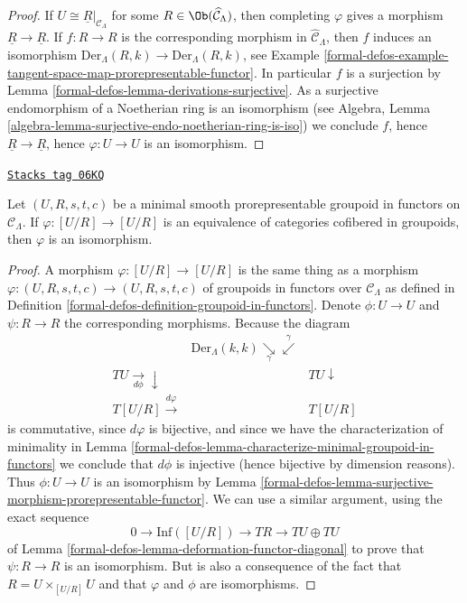 \begin{proof}
If $U \cong \underline{R}|_{\mathcal{C}_\Lambda}$ for some
$R \in \Ob(\widehat{\mathcal{C}}_\Lambda)$,
then completing $\varphi$ gives a morphism $\underline{R} \to \underline{R}$.
If $f: R \to R$ is the corresponding morphism in
$\widehat{\mathcal{C}}_\Lambda$, then $f$ induces an isomorphism
$\text{Der}_\Lambda(R, k) \to \text{Der}_\Lambda(R, k)$, see
Example \ref{formal-defos-example-tangent-space-map-prorepresentable-functor}.
In particular $f$ is a surjection by
Lemma \ref{formal-defos-lemma-derivations-surjective}.
As a surjective endomorphism of a Noetherian ring is an isomorphism (see
Algebra, Lemma \ref{algebra-lemma-surjective-endo-noetherian-ring-is-iso})
we conclude $f$, hence $\underline{R}
\to \underline{R}$, hence $\varphi : U \to U$
is an isomorphism.
\end{proof}

\begin{lemma}
\label{formal-defos-lemma-minimal-prorepresentable-groupoid-autoequivalence}
\href{https://stacks.math.columbia.edu/tag/06KQ}{\texttt{Stacks tag 06KQ}}

Let $(U, R, s, t, c)$ be a minimal smooth prorepresentable groupoid in
functors on $\mathcal{C}_\Lambda$. If $\varphi : [U/R] \to [U/R]$ is an
equivalence of categories cofibered in groupoids, then $\varphi$ is an
isomorphism.
\end{lemma}

\begin{proof}
A morphism $\varphi : [U/R] \to [U/R]$ is the same thing as a
morphism $\varphi : (U, R, s, t, c) \to (U, R, s, t, c)$ of
groupoids in functors over $\mathcal{C}_\Lambda$ as defined in
Definition \ref{formal-defos-definition-groupoid-in-functors}.
Denote $\phi : U \to U$ and $\psi : R \to R$ the corresponding morphisms.
Because the diagram
$$
\begin{array}{ccc} & \text{Der}_\Lambda(k, k) \underset{\gamma}{\searrow}\overset{\gamma}{\swarrow} &  \\ TU \underset{d\phi}{\longrightarrow}\downarrow &  & TU \downarrow \\ T[U/R] \overset{d\varphi}{\longrightarrow} &  & T[U/R]\end{array}
$$
is commutative, since $d\varphi$ is bijective, and since we have
the characterization of minimality in
Lemma \ref{formal-defos-lemma-characterize-minimal-groupoid-in-functors}
we conclude that $d\phi$ is injective (hence bijective by dimension reasons).
Thus $\phi : U \to U$ is an isomorphism by
Lemma \ref{formal-defos-lemma-surjective-morphism-prorepresentable-functor}.
We can use a similar argument, using the exact sequence
$$
0 \to \text{Inf}([U/R]) \to TR \to TU \oplus TU
$$
of
Lemma \ref{formal-defos-lemma-deformation-functor-diagonal}
to prove that $\psi : R \to R$ is an isomorphism. But is also a consequence
of the fact that $R = U \times_{[U/R]} U$ and that $\varphi$ and $\phi$
are isomorphisms.
\end{proof}

